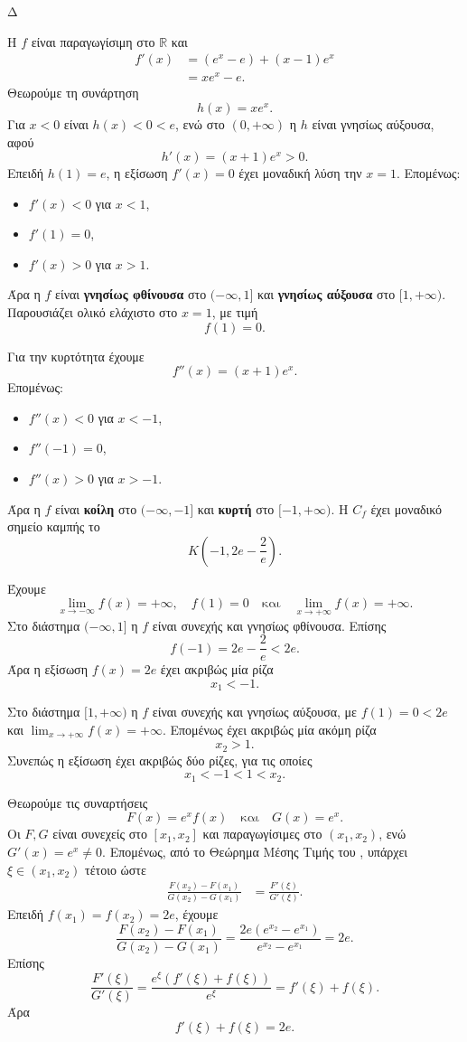 
\begin{thema}{Δ}
\begin{erwthma}
\item Η $f$ είναι παραγωγίσιμη στο $\mathbb{R}$ και
\begin{align*}
f'(x)
&=(e^x-e)+(x-1)e^x\\
&=xe^x-e.
\end{align*}
Θεωρούμε τη συνάρτηση
\[
h(x)=xe^x.
\]
Για $x<0$ είναι $h(x)<0<e$, ενώ στο $(0,+\infty)$ η $h$ είναι γνησίως αύξουσα, αφού
\[
h'(x)=(x+1)e^x>0.
\]
Επειδή $h(1)=e$, η εξίσωση $f'(x)=0$ έχει μοναδική λύση την $x=1$. Επομένως:
\begin{itemize}
\item $f'(x)<0$ για $x<1$,
\item $f'(1)=0$,
\item $f'(x)>0$ για $x>1$.
\end{itemize}
Άρα η $f$ είναι \textbf{γνησίως φθίνουσα} στο $(-\infty,1]$ και \textbf{γνησίως αύξουσα} στο $[1,+\infty)$. Παρουσιάζει ολικό ελάχιστο στο $x=1$, με τιμή
\[
{f(1)=0}.
\]

Για την κυρτότητα έχουμε
\[
f''(x)=(x+1)e^x.
\]
Επομένως:
\begin{itemize}
\item $f''(x)<0$ για $x<-1$,
\item $f''(-1)=0$,
\item $f''(x)>0$ για $x>-1$.
\end{itemize}
Άρα η $f$ είναι \textbf{κοίλη} στο $(-\infty,-1]$ και \textbf{κυρτή} στο $[-1,+\infty)$. Η $C_f$ έχει μοναδικό σημείο καμπής το
\[
{K\left(-1,2e-\frac{2}{e}\right)}.
\]

\item Έχουμε
\[
\lim_{x\to-\infty}f(x)=+\infty,
\quad
f(1)=0
\quad\text{και}\quad
\lim_{x\to+\infty}f(x)=+\infty.
\]
Στο διάστημα $(-\infty,1]$ η $f$ είναι συνεχής και γνησίως φθίνουσα. Επίσης
\[
f(-1)=2e-\frac{2}{e}<2e.
\]
Άρα η εξίσωση $f(x)=2e$ έχει ακριβώς μία ρίζα
\[
x_1<-1.
\]

Στο διάστημα $[1,+\infty)$ η $f$ είναι συνεχής και γνησίως αύξουσα, με $f(1)=0<2e$ και $\lim_{x\to+\infty}f(x)=+\infty$. Επομένως έχει ακριβώς μία ακόμη ρίζα
\[
x_2>1.
\]
Συνεπώς η εξίσωση έχει ακριβώς δύο ρίζες, για τις οποίες
\[
{x_1<-1<1<x_2}.
\]

\item Θεωρούμε τις συναρτήσεις
\[
F(x)=e^xf(x)
\quad\text{και}\quad
G(x)=e^x.
\]
Οι $F,G$ είναι συνεχείς στο $[x_1,x_2]$ και παραγωγίσιμες στο $(x_1,x_2)$, ενώ $G'(x)=e^x\neq0$. Επομένως, από το Θεώρημα Μέσης Τιμής του , υπάρχει $\xi\in(x_1,x_2)$ τέτοιο ώστε
\begin{align*}
\frac{F(x_2)-F(x_1)}{G(x_2)-G(x_1)}
&=\frac{F'(\xi)}{G'(\xi)}.
\end{align*}
Επειδή $f(x_1)=f(x_2)=2e$, έχουμε
\[
\frac{F(x_2)-F(x_1)}{G(x_2)-G(x_1)}
=\frac{2e(e^{x_2}-e^{x_1})}{e^{x_2}-e^{x_1}}
=2e.
\]
Επίσης
\[
\frac{F'(\xi)}{G'(\xi)}
=\frac{e^\xi\left(f'(\xi)+f(\xi)\right)}{e^\xi}
=f'(\xi)+f(\xi).
\]
Άρα
\[
{f'(\xi)+f(\xi)=2e}.
\]


\end{erwthma}
\end{thema}

